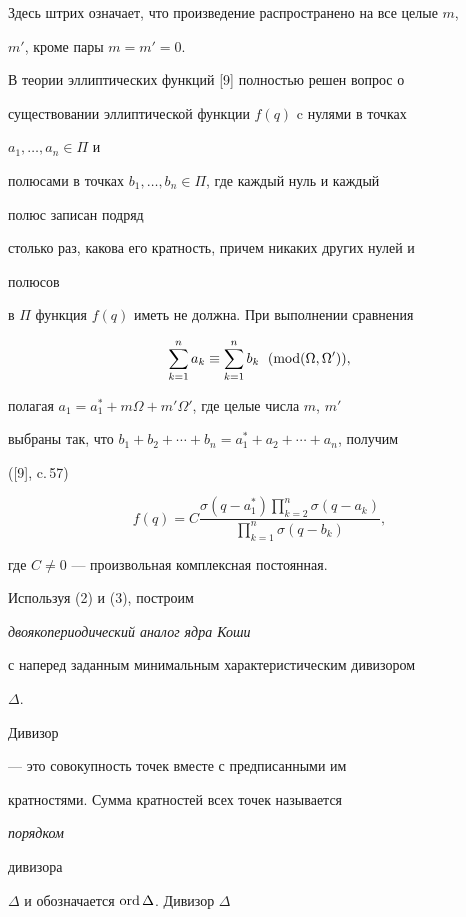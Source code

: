 Здесь штрих означает, что произведение распространено на все целые $m$, 


$m'$, кроме пары $m=m'=0$. 


 


В теории эллиптических функций [9] полностью решен вопрос о 


существовании эллиптической функции $f(q)$ c нулями в точках 


$a_1,\dotsc,a_n\in\Pi$ и 


полюсами в точках $b_1,\dotsc,b_n\in\Pi$, где каждый нуль и каждый 


полюс записан подряд 


столько раз, какова его кратность, причем никаких других нулей и 


полюсов 


в $\Pi$ функция $f(q)$ иметь не должна. При выполнении сравнения 


\begin{equation} 


\sum^n_{k=1}a_k\equiv\sum^n_{k=1}b_k\ \;(\Mod(\Omega,\Omega')),


\end{equation} 


полагая $a_1=a^*_1+m\Omega+m'\Omega'$, где целые числа $m$, $m'$ 


выбраны так, что $b_1+b_2+\dotsb+b_n=a^*_1+a_2+\dotsb+a_n$, получим 


([9], c.\,57) 


\begin{equation} 


f(q)=C 


\frac{\sigma(q-a^*_1)\prod\limits^n_{k=2}\sigma(q-a_k)} 


{\prod\limits^n_{k=1}\sigma(q-b_k)}, 


\end{equation} 


где $C\ne 0$ --- произвольная комплексная постоянная. 


 


Используя (2) и (3), построим {\it двоякопериодический аналог ядра Коши 


с наперед заданным минимальным характеристическим дивизором} $\Delta$. 


{\it 


Дивизор} --- это совокупность точек вместе с предписанными им 


кратностями. Сумма кратностей всех точек называется {\it порядком 


дивизора} $\Delta$ и обозначается $\operatorname{ord}\Delta$. Дивизор $\Delta$ 


